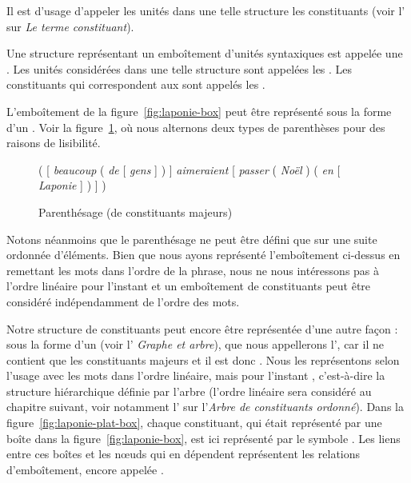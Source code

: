 Il est d’usage d’appeler les unités dans une telle structure les constituants (voir l’ sur \textit{Le terme constituant}).

{Une structure représentant un emboîtement d'unités syntaxiques est appelée une . Les unités considérées dans une telle structure sont appelées les . Les constituants qui correspondent aux  sont appelés les .}

L'emboîtement de la figure~\ref{fig:laponie-box} peut être représenté sous la forme d’un . Voir la figure~\ref{fig:laponie-parenthese}, où nous alternons deux types de parenthèses pour des raisons de lisibilité.

\begin{figure}
     ( [ \textit{beaucoup} ( \textit{de} [ \textit{gens} ] ) ] \textit{aimeraient} [ \textit{passer} ( \textit{Noël} ) ( \textit{en} [ \textit{Laponie} ] ) ] )
\caption{\label{fig:laponie-parenthese}Parenthésage (de constituants majeurs)}

\end{figure}

Notons néanmoins que le parenthésage ne peut être défini que sur une suite ordonnée d’éléments. Bien que nous ayons représenté l’emboîtement ci-dessus en remettant les mots dans l’ordre de la phrase, nous ne nous intéressons pas à l’ordre linéaire pour l’instant et un emboîtement de constituants peut être considéré indépendamment de l’ordre des mots.

Notre structure de constituants peut encore être représentée d’une autre façon : sous la forme d’un  (voir l' \textit{Graphe et arbre}), que nous appellerons l’, car il ne contient que les constituants majeurs et il est donc . Nous les représentons selon l’usage avec les mots dans l’ordre linéaire, mais  pour l’instant  , c’est-à-dire la structure hiérarchique définie par l’arbre (l’ordre linéaire sera considéré au chapitre suivant, voir notamment l’ sur l'\textit{Arbre de constituants ordonné}). Dans la figure~\ref{fig:laponie-plat-box}, chaque constituant, qui était représenté par une boîte dans la figure~\ref{fig:laponie-box}, est ici représenté par le symbole {\Boite}. Les liens entre ces boîtes et les nœuds qui en dépendent représentent les relations d'emboîtement, encore appelée .

